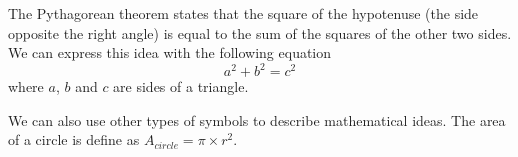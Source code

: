\documentclass[11pt,a4paper]{article}
\begin{document}
The Pythagorean theorem states that the square of the hypotenuse (the side
opposite the right angle) is equal to the sum of the squares of the other two
sides. We can express this idea with the following equation $$a^2+b^2=c^2$$
where $a$, $b$ and $c$ are sides of a triangle.

We can also use other types of symbols to describe mathematical ideas. The
area of a circle is define as $A_{circle}= \pi \times r^2$.
\end{document}

